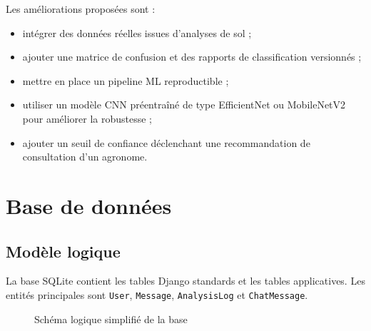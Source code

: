 \documentclass[12pt,a4paper]{report}
\begin{document}
Les améliorations proposées sont :
\begin{itemize}[noitemsep]
  \item intégrer des données réelles issues d'analyses de sol ;
  \item ajouter une matrice de confusion et des rapports de classification versionnés ;
  \item mettre en place un pipeline ML reproductible ;
  \item utiliser un modèle CNN préentraîné de type EfficientNet ou MobileNetV2 pour améliorer la robustesse ;
  \item ajouter un seuil de confiance déclenchant une recommandation de consultation d'un agronome.
\end{itemize}

\chapter{Base de données}

\section{Modèle logique}
La base SQLite contient les tables Django standards et les tables applicatives. Les entités principales sont \texttt{User}, \texttt{Message}, \texttt{AnalysisLog} et \texttt{ChatMessage}.

\begin{figure}[H]
\centering
{}
\caption{Schéma logique simplifié de la base}
\end{figure}
\end{document}
